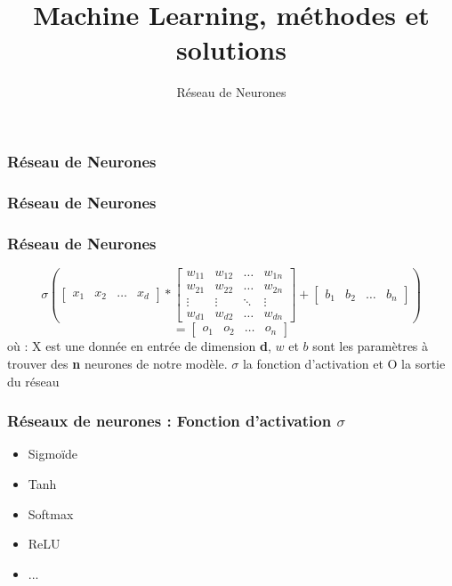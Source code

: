 \documentclass{formation}
\title{Machine Learning, méthodes et solutions}
\subtitle{Réseau de Neurones}
\begin{document}
\maketitle

\begin{frame}
  \frametitle{Réseau de Neurones}
\end{frame}

\begin{frame}
  \frametitle{Réseau de Neurones}
\end{frame}

\begin{frame}
  \frametitle{Réseau de Neurones}
  \[
  \sigma \left(
  \begin{bmatrix}
    x_{1} & x_{2} & \dots & x_{d}
  \end{bmatrix}
  *
  \begin{bmatrix}
    w_{11} & w_{12} & \dots  & w_{1n} \\
    w_{21} & w_{22} & \dots  & w_{2n} \\
    \vdots & \vdots & \ddots & \vdots \\
    w_{d1} & w_{d2} & \dots  & w_{dn}
  \end{bmatrix}
  +
  \begin{bmatrix}
    b_{1} & b_{2} & \dots & b_{n}
  \end{bmatrix}
  \right )
  \]
  \[
  =
  \begin{bmatrix}
    o_{1} & o_{2} & \dots & o_{n}
  \end{bmatrix}
  \]
  \newline
  où :
  \newline
  X est une donnée en entrée de dimension \textbf{d},
  \newline
  $w$ et $b$ sont les paramètres à trouver des \textbf{n} neurones de notre modèle.
  \newline
  $\sigma$ la fonction d'activation et
  \newline
  O la sortie du réseau
\end{frame}

\begin{frame}
  \frametitle{Réseaux de neurones : Fonction d'activation $\sigma$}
  \begin{itemize}
  \item Sigmoïde
  \item Tanh
  \item Softmax
  \item ReLU
  \item ...
  \end{itemize}
\end{frame}
\end{document}
